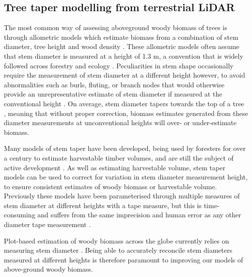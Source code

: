 \begin{refsection}
\subsection{Tree taper modelling from terrestrial LiDAR} 
\label{legacy:ssec:taper}

The most common way of assessing aboveground woody biomass of trees is through allometric models which estimate biomass from a combination of stem diameter, tree height and wood density \citep{Chave2014}. These allometric models often assume that stem diameter is measured at a height of 1.3 m, a convention that is widely followed across forestry and ecology \citep{Brokaw2000}. Peculiarities in stem shape occasionally require the measurement of stem diameter at a different height however, to avoid abnormalities such as burls, fluting, or branch nodes that would otherwise provide an unrepresentative estimate of stem diameter if measured at the conventional height \citep{Kershaw2017}. On average, stem diameter tapers towards the top of a tree \citep{Kozak1969}, meaning that without proper correction, biomass estimates generated from these diameter measurements at unconventional heights will over- or under-estimate biomass. 

Many models of stem taper have been developed, being used by foresters for over a century to estimate harvestable timber volumes, and are still the subject of active development \citep{MacFarlane2016, Luoma2019}. As well as estimating harvestable volume, stem taper models can be used to correct for variation in stem diameter measurement height, to ensure consistent estimates of woody biomass or harvestable volume. Previously these models have been parameterised through multiple measures of stem diameter at different heights with a tape measure, but this is time-consuming and suffers from the same imprecision and human error as any other diameter tape measurement \citep{Saarinen2019}. 

Plot-based estimation of woody biomass across the globe currently relies on measuring stem diameter \citep{SEOSAW2020, Chave2005, Schepaschenko2019}. Being able to accurately reconcile stem diameters measured at different heights is therefore paramount to improving our models of above-ground woody biomass.


\end{refsection}
